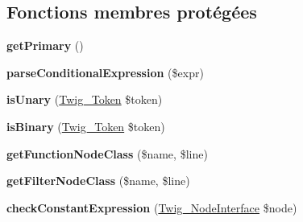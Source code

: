 \subsection*{Fonctions membres protégées}
\begin{DoxyCompactItemize}
\item 
{\bfseries get\+Primary} ()\hypertarget{class_twig___expression_parser_ad3c735d971b18f6f257dd9262d628f00}{}\label{class_twig___expression_parser_ad3c735d971b18f6f257dd9262d628f00}

\item 
{\bfseries parse\+Conditional\+Expression} (\$expr)\hypertarget{class_twig___expression_parser_aa7c8eaf0835312785a61fca03baa062b}{}\label{class_twig___expression_parser_aa7c8eaf0835312785a61fca03baa062b}

\item 
{\bfseries is\+Unary} (\hyperlink{class_twig___token}{Twig\+\_\+\+Token} \$token)\hypertarget{class_twig___expression_parser_ac819054852f12938e03d283e9002bfae}{}\label{class_twig___expression_parser_ac819054852f12938e03d283e9002bfae}

\item 
{\bfseries is\+Binary} (\hyperlink{class_twig___token}{Twig\+\_\+\+Token} \$token)\hypertarget{class_twig___expression_parser_a94df003406378be0d7c78f6ff1fd12ba}{}\label{class_twig___expression_parser_a94df003406378be0d7c78f6ff1fd12ba}

\item 
{\bfseries get\+Function\+Node\+Class} (\$name, \$line)\hypertarget{class_twig___expression_parser_ac85cfaf30eb3bc32f566786d0f1791ff}{}\label{class_twig___expression_parser_ac85cfaf30eb3bc32f566786d0f1791ff}

\item 
{\bfseries get\+Filter\+Node\+Class} (\$name, \$line)\hypertarget{class_twig___expression_parser_a33ad151dffb8286fa3a54fc845dc0c6c}{}\label{class_twig___expression_parser_a33ad151dffb8286fa3a54fc845dc0c6c}

\item 
{\bfseries check\+Constant\+Expression} (\hyperlink{interface_twig___node_interface}{Twig\+\_\+\+Node\+Interface} \$node)\hypertarget{class_twig___expression_parser_a8ce9c84d646fc4bd779027171ea9f3ef}{}\label{class_twig___expression_parser_a8ce9c84d646fc4bd779027171ea9f3ef}

\end{DoxyCompactItemize}

